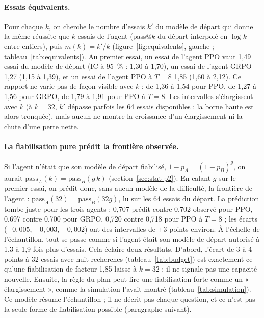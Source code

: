 \documentclass[11pt,a4paper]{article}
\begin{document}
\paragraph{Essais équivalents.} Pour chaque $k$, on cherche le nombre d'essais $k'$ du modèle de départ qui donne la même réussite que $k$ essais de l'agent (pass@$k$ du départ interpolé en $\log k$ entre entiers), puis $m(k) = k'/k$ (figure~\ref{fig:equivalents}, gauche ; tableau~\ref{tab:equivalents}). Au premier essai, un essai de l'agent PPO vaut 1,49 essai du modèle de départ (IC à 95~\% : 1,30 à 1,70), un essai de l'agent GRPO 1,27 (1,15 à 1,39), et un essai de l'agent PPO à $T = 8$ 1,85 (1,60 à 2,12). Ce rapport ne varie pas de façon visible avec $k$ : de 1,36 à 1,54 pour PPO, de 1,27 à 1,56 pour GRPO, de 1,79 à 1,91 pour PPO à $T = 8$. Les intervalles s'élargissent avec $k$ (à $k = 32$, $k'$ dépasse parfois les 64 essais disponibles : la borne haute est alors tronquée), mais aucun ne montre la croissance d'un élargissement ni la chute d'une perte nette.

\paragraph{La fiabilisation pure prédit la frontière observée.} Si l'agent n'était que son modèle de départ fiabilisé, $1 - p_A = (1 - p_B)^g$, on aurait $\text{pass}_A(k) = \text{pass}_B(g\,k)$ (section~\ref{sec:stat-p2}). En calant $g$ sur le premier essai, on prédit donc, sans aucun modèle de la difficulté, la frontière de l'agent : $\text{pass}_A(32) = \text{pass}_B(32 g)$, lu sur les 64 essais du départ. La prédiction tombe juste pour les trois agents : 0,707 prédit contre 0,702 observé pour PPO, 0,697 contre 0,700 pour GRPO, 0,720 contre 0,718 pour PPO à $T = 8$ ; les écarts ($-0{,}005$, $+0{,}003$, $-0{,}002$) ont des intervalles de $\pm 3$ points environ. À l'échelle de l'échantillon, tout se passe comme si l'agent était son modèle de départ autorisé à 1,3 à 1,9 fois plus d'essais. Cela éclaire deux résultats. D'abord, l'écart de 3 à 4 points à 32 essais avec huit recherches (tableau~\ref{tab:budget}) est exactement ce qu'une fiabilisation de facteur 1,85 laisse à $k = 32$ : il ne signale pas une capacité nouvelle. Ensuite, la règle du plan peut lire une fiabilisation forte comme un « élargissement », comme la simulation l'avait montré (tableau~\ref{tab:simulation}). Ce modèle résume l'échantillon ; il ne décrit pas chaque question, et ce n'est pas la seule forme de fiabilisation possible (paragraphe suivant).
\end{document}
